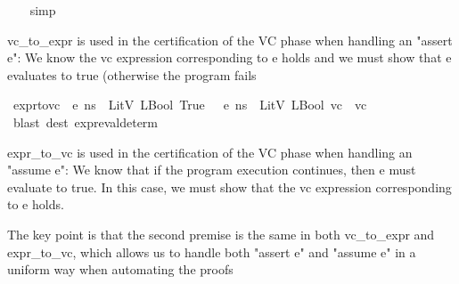 \begin{isabellebody}
%
\isadelimproof
\ \ %
\endisadelimproof
%
\isatagproof
{}\isamarkupfalse%
\ simp%
\endisatagproof
{\isafoldproof}%
%
\isadelimproof
%
\endisadelimproof
%
\begin{isamarkuptext}%
vc_to_expr is used in the certification of the VC phase when handling an "assert e": We know
the vc expression corresponding to e holds and we must show that e evaluates to true (otherwise the
program fails%
\end{isamarkuptext}\isamarkuptrue%
\isamarkupfalse%
\ expr{\isacharunderscore}{\kern0pt}to{\isacharunderscore}{\kern0pt}vc{\isacharcolon}{\kern0pt}{\isachardoublequoteopen}{\isasymlbrakk}{\isasymLambda}{\isacharcomma}{\kern0pt}{\isasymGamma}{\isacharcomma}{\kern0pt}{\isasymOmega}\ {\isasymturnstile}\ {\isasymlangle}e{\isacharcomma}{\kern0pt}\ ns{\isasymrangle}\ {\isasymDown}\ LitV\ {\isacharparenleft}{\kern0pt}LBool\ True{\isacharparenright}{\kern0pt}{\isacharsemicolon}{\kern0pt}\ {\isasymLambda}{\isacharcomma}{\kern0pt}{\isasymGamma}{\isacharcomma}{\kern0pt}{\isasymOmega}\ {\isasymturnstile}\ {\isasymlangle}e{\isacharcomma}{\kern0pt}\ ns{\isasymrangle}\ {\isasymDown}\ LitV\ {\isacharparenleft}{\kern0pt}LBool\ vc{\isacharparenright}{\kern0pt}{\isasymrbrakk}\ {\isasymLongrightarrow}\ vc{\isachardoublequoteclose}\isanewline
%
\isadelimproof
\ \ %
\endisadelimproof
%
\isatagproof
{}\isamarkupfalse%
\ {\isacharparenleft}{\kern0pt}blast\ dest{\isacharcolon}{\kern0pt}\ expr{\isacharunderscore}{\kern0pt}eval{\isacharunderscore}{\kern0pt}determ{\isacharparenright}{\kern0pt}%
\endisatagproof
{\isafoldproof}%
%
\isadelimproof
%
\endisadelimproof
%
\begin{isamarkuptext}%
expr_to_vc is used in the certification of the VC phase when handling an "assume e": We know 
that if the program execution continues, then e must evaluate to true. In this case, we must show
that the vc expression corresponding to e holds.%
\end{isamarkuptext}\isamarkuptrue%
%
\begin{isamarkuptext}%
The key point is that the second premise is the same in both vc_to_expr and expr_to_vc, which
allows us to handle both "assert e" and "assume e" in a uniform way when automating the proofs%
\end{isamarkuptext}\isamarkuptrue%
%
\isadelimdocument
%
\endisadelimdocument
%
\isatagdocument
%
\isamarkuptrue%
%
\endisatagdocument
{\isafolddocument}%
%

\end{isabellebody}
